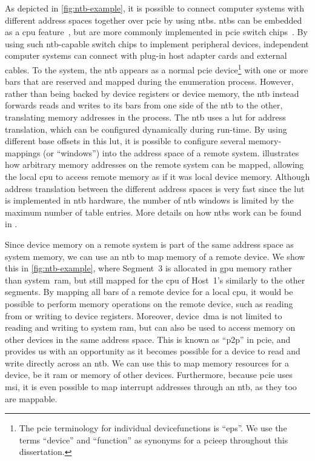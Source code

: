 As depicted in \cref{fig:ntb-example}, it is possible to connect computer systems with different address spaces together over \gls{pcie} by using \glspl{ntb}.
%
\Glspl{ntb} can be embedded as a \gls{cpu} feature~\cite{whitepaper:Sullivan2010,url:LinuxNTB-AMD}, but are more commonly implemented in \gls{pcie} switch chips~\cite{whitepaper:PLX,pex8733}.
%
By using such \gls{ntb}-capable switch chips to implement peripheral devices, independent computer systems can connect with plug-in host adapter cards and external cables.
%
To the system, the \gls{ntb} appears as a normal \gls{pcie} device\footnote{The \gls{pcie} terminology for individual \glspl{devicefunction} is ``\glspl{ep}''. We use the terms ``device'' and ``\gls{function}'' as synonyms for a \gls{pcieep} throughout this dissertation.} with one or more \glspl{bar} that are reserved and mapped during the enumeration process.
%
However, rather than being backed by device registers or device memory, the \gls{ntb} instead forwards reads and writes to its \glspl{bar} from one side of the \gls{ntb} to the other, translating memory addresses in the process.
%
The \gls{ntb} uses a \gls{lut} for address translation, which can be configured dynamically during run-time.
%
By using different base offsets in this \gls{lut}, it is possible to configure several memory-mappings (or ``windows'') into the address space of a remote system.
%
 illustrates how arbitrary memory addresses on the remote system can be mapped, allowing the local \gls{cpu} to access remote memory as if it was local device memory.
%
Although address translation between the different address spaces is very fast since the \gls{lut} is implemented in \gls{ntb} hardware, the number of \gls{ntb} windows is limited by the maximum number of table entries.
%
More details on how \glspl{ntb} work can be found in .



Since device memory on a remote system is part of the same address space as system memory, we can use an \gls{ntb} to map memory of a remote device.
%
We show this in \cref{fig:ntb-example}, where Segment~3 is allocated in \gls{gpu} memory rather than system~\gls{ram}, but still mapped for the \gls{cpu} of Host~1's similarly to the other \glspl{segment}.
%
By mapping all \glspl{bar} of a remote device for a local \gls{cpu}, it would be possible to perform memory operations on the remote device, such as reading from or writing to device registers.
%
Moreover, device~\gls{dma} is not limited to reading and writing to system \gls{ram}, but can also be used to access memory on other devices in the same address space.
%
This is known as ``\gls{p2p}'' in \gls{pcie}, and provides us with an opportunity as it becomes possible for a device to read and write directly across an \gls{ntb}.
%
We can use this to map memory resources for a device, be it \gls{ram} or memory of other devices. 
%
Furthermore, because \gls{pcie} uses \gls{msi}, it is even possible to map interrupt addresses through an \gls{ntb}, as they too are mappable.




